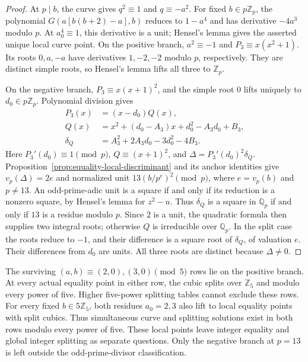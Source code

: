 \begin{proof}
At $p\mid b$, the curve gives $q^2\equiv1$ and $q\equiv-a^2$.
For fixed $b\in p\mathbb Z_p$, the polynomial
$G(a[b(b+2)-a],b)$ reduces to $1-a^4$ and has derivative $-4a^3$
modulo $p$. At $a_0^4\equiv1$, this derivative is a unit; Hensel's
lemma gives the asserted unique local curve point.
On the positive branch, $a^2\equiv-1$ and
$P_3\equiv x(x^2+1)$. Its roots $0,a,-a$ have derivatives $1,-2,-2$
modulo $p$, respectively. They are distinct simple roots, so Hensel's
lemma lifts all three to $\mathbb Z_p$.

On the negative branch, $P_3\equiv x(x+1)^2$, and the simple root $0$
lifts uniquely to $d_0\in p\mathbb Z_p$. Polynomial division gives
\begin{align*}
 P_3(x)&=(x-d_0)Q(x),\\
 Q(x)&=x^2+(d_0-A_3)x+d_0^2-A_3d_0+B_3,\\
 \delta_Q&=A_3^2+2A_3d_0-3d_0^2-4B_3.
\end{align*}
Here $P_3'(d_0)\equiv1\pmod p$, $Q\equiv(x+1)^2$, and
$\Delta=P_3'(d_0)^2\delta_Q$. Proposition~\ref{prop:equality-local-discriminant}
and its anchor identities give $v_p(\Delta)=2e$ and normalized unit
$13(b/p^e)^2\pmod p$, where $e=v_p(b)$ and $p\ne13$.
An odd-prime-adic unit is a square if and only if its reduction is a
nonzero square, by Hensel's lemma for $z^2-u$. Thus $\delta_Q$ is a
square in $\mathbb Q_p$ if and only if $13$ is a residue modulo $p$.
Since $2$ is a unit, the quadratic formula then supplies two integral
roots; otherwise $Q$ is irreducible over $\mathbb Q_p$.
In the split case the roots reduce to $-1$, and their difference is a
square root of $\delta_Q$, of valuation $e$. Their differences from
$d_0$ are units. All three roots are distinct because $\Delta\ne0$.
\end{proof}

The surviving $(a,b)\equiv(2,0),(3,0)\pmod5$ rows lie on the positive
branch. At every actual equality point in either row, the cubic splits
over $\mathbb Z_5$ and modulo every power of five. Higher five-power
splitting tables cannot exclude these rows.
For every fixed $b\in5\mathbb Z_5$, both residues $a_0=2,3$ also lift
to local equality points with split cubics. Thus simultaneous curve
and splitting solutions exist in both rows modulo every power of five.
These local points leave integer equality and global integer splitting as separate
questions. Only the negative branch at $p=13$ is left outside the
odd-prime-divisor classification.

